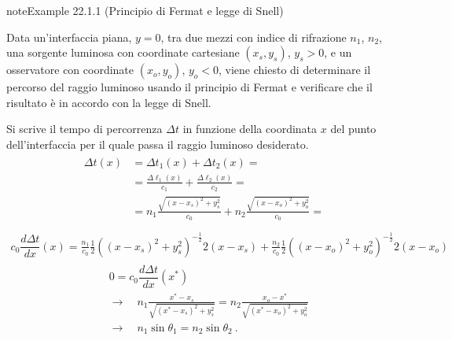 \documentclass[letterpaper,10pt,italian]{jupyterBook}
\begin{document}
\begin{sphinxadmonition}{note}{Example 22.1.1 (Principio di Fermat e legge di Snell)}



\sphinxAtStartPar
Data un’interfaccia piana, \(y=0\), tra due mezzi con indice di rifrazione \(n_1\), \(n_2\), una sorgente luminosa con coordinate cartesiane \((x_s, y_s)\), \(y_s > 0\), e un osservatore con coordinate \((x_o, y_o)\), \(y_o < 0\), viene chiesto di determinare il percorso del raggio luminoso usando il principio di Fermat e verificare che il risultato è in accordo con la legge di Snell.

\sphinxAtStartPar
Si scrive il tempo di percorrenza \(\Delta t\) in funzione della coordinata \(x\) del punto dell’interfaccia per il quale passa il raggio luminoso desiderato.
\begin{equation*}
\begin{split}\begin{aligned}
\Delta t(x) 
  & = \Delta t_1(x) + \Delta t_2(x) = \\
  & = \frac{\Delta \ell_1(x)}{c_1} + \frac{\Delta \ell_2(x)}{c_2} = \\
  & = n_1 \frac{\sqrt{(x-x_s)^2 + y_s^2}}{c_0} + n_2 \frac{\sqrt{(x-x_o)^2 + y_o^2}}{c_0} = \\
\end{aligned}\end{split}
\end{equation*}\begin{equation*}
\begin{split}
c_0 \dfrac{d \Delta t}{dx}(x) 
= \frac{n_1}{c_0} \frac{1}{2} \left( (x-x_s)^2 + y_s^2 \right)^{-\frac{1}{2}} 2 (x-x_s)
+ \frac{n_2}{c_0} \frac{1}{2} \left( (x-x_o)^2 + y_o^2 \right)^{-\frac{1}{2}} 2 (x-x_o)
\end{split}
\end{equation*}\begin{equation*}
\begin{split}\begin{aligned}
  & 0 = c_0 \dfrac{d \Delta t}{dx}(x^*) \\
  & \rightarrow \quad n_1 \frac{x^* - x_s}{\sqrt{(x^*-x_s)^2 + y_s^2}} = n_2 \frac{x_o - x^*}{\sqrt{(x^*-x_o)^2 + y_o^2}} \\ 
  & \rightarrow \quad n_1 \sin \theta_1 = n_2 \sin \theta_2 \ .
\end{aligned}\end{split}
\end{equation*}\end{sphinxadmonition}
\end{document}
